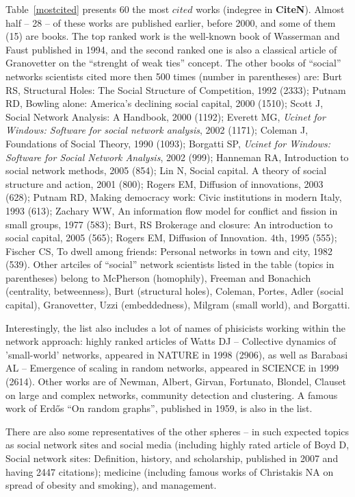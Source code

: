 \documentclass[11pt]{article} %
\begin{document}
Table~\ref{mostcited} presents 60 the most $cited$ works (indegree in \textbf{CiteN}). Almost half -- 28 -- of these works are published earlier, before 2000, and some of them (15) are books. The top ranked work is the well-known book of Wasserman and Faust published in 1994, and the second ranked one is also a classical article of Granovetter on the ``strenght of weak ties'' concept. The other books of  ``social'' networks scientists cited more then 500 times (number in parentheses) are:  Burt RS, Structural Holes: The Social Structure of Competition, 1992 (2333); Putnam RD, Bowling alone: America’s declining social capital, 2000 (1510); Scott J, Social Network Analysis: A Handbook, 2000 (1192); Everett MG, \textit{Ucinet for Windows: Software for social network analysis}, 2002 (1171); Coleman J, Foundations of Social Theory, 1990 (1093); Borgatti SP,  \textit{Ucinet for Windows: Software for Social Network Analysis}, 2002 (999); Hanneman RA, Introduction to social network methods, 2005 (854); Lin N, Social capital. A theory of social structure and action, 2001 (800); Rogers EM, Diffusion of innovations, 2003 (628); Putnam RD, Making democracy work: Civic institutions in modern Italy, 1993 (613); Zachary WW, An information flow model for conflict and fission in small groups, 1977 (583); Burt, RS	Brokerage and closure: An introduction to social capital, 2005 (565);  Rogers EM, Diffusion of Innovation. 4th, 1995 (555);  Fischer CS, To dwell among friends: Personal networks in town and city, 1982 (539). Other artciles of ``social'' network scientists listed in the table (topics in parentheses) belong to McPherson (homophily), Freeman and Bonachich (centrality, betweenness), Burt (structural holes), Coleman, Portes, Adler (social capital), Granovetter, Uzzi (embeddedness), Milgram (small world), and Borgatti. \medskip 

Interestingly, the list also includes a lot of names of phisicists working within the network approach: highly ranked articles of Watts DJ -- Collective dynamics of 'small-world' networks, appeared in NATURE in 1998 (2906), as well as Barabasi AL --  Emergence of scaling in random networks, appeared in SCIENCE in 1999 (2614). Other works are of Newman, Albert, Girvan, Fortunato, Blondel, Clauset on large and complex networks, community detection and clustering. A famous work of Erd\H{o}s ``On random graphs'', published in 1959, is also in the list. \medskip 

There are also some representatives of the other spheres -- in such expected  topics as social network sites and social media (including highly rated article of Boyd D, Social network sites: Definition, history, and scholarship, published in 2007 and having 2447 citations); medicine (including famous works of Christakis NA on spread of obesity and smoking), and management. \medskip 
\end{document}
